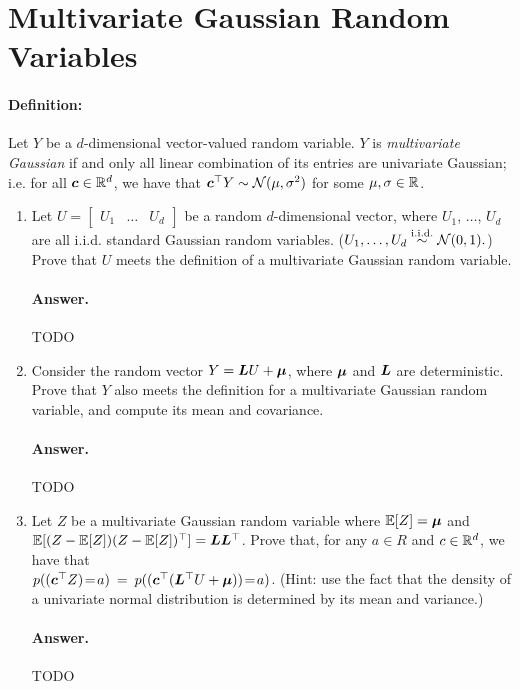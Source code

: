 \documentclass[11pt,letterpaper]{article}
\newenvironment{answer}{%
    \vspace{1em}
    \color{black}
    \paragraph{Answer.}
  }{%
    \vspace{1em}
  }
\begin{document}
\section{Multivariate Gaussian Random Variables}

\paragraph{Definition:}
Let $Y$ be a $d$-dimensional vector-valued random variable.
$Y$ is \emph{multivariate Gaussian} if and only all linear combination of its entries are univariate Gaussian;
i.e. for all ${\bm{c}} \in \mathbb{R}^d$, we have that ${\bm{c}}^\top Y \sim \mathcal{N}(\mu, \sigma^2)$ for some $\mu, \sigma \in \mathbb{R}$.

\begin{enumerate}
  \item Let $U = \begin{bmatrix} U_1 & \ldots & U_d\end{bmatrix}$ be a random $d$-dimensional vector,
    where $U_1$, $\ldots$, $U_d$ are all i.i.d. standard Gaussian random variables.
    ($U_1, \ldots, U_d \overset{\mathrm{i.i.d.}}{\sim} \mathcal{N}(0, 1).$)
    Prove that $U$ meets the definition of a multivariate Gaussian random variable.

\begin{answer}
  TODO
\end{answer}

  \item Consider the random vector $Y = {\bm{L}} U + {\bm{\mu}}$, where ${\bm{\mu}}$ and ${\bm{L}}$ are deterministic.
    Prove that $Y$ also meets the definition for a multivariate Gaussian random variable, and compute its mean and covariance.

\begin{answer}
  TODO
\end{answer}

  \item Let $Z$ be a multivariate Gaussian random variable where $\mathbb{E}[Z] = {\bm{\mu}}$ and \\
    $\mathbb{E}[(Z - \mathbb{E}[Z])(Z - \mathbb{E}[Z])^\top] = {\bm{L}}{\bm{L}}^\top$.
    Prove that, for any $a \in R$ and $c \in \mathbb{R}^d$, we have that \\
    $p(({\bm{c}}^\top Z)\!=\!a) \: = \: p(({\bm{c}}^\top ({\bm{L}}^\top U + {\bm{\mu}}))\!=\!a)$.
    (Hint: use the fact that the density of a univariate normal distribution is determined by its mean and variance.)

\begin{answer}
  TODO
\end{answer}

\end{enumerate}
\end{document}
